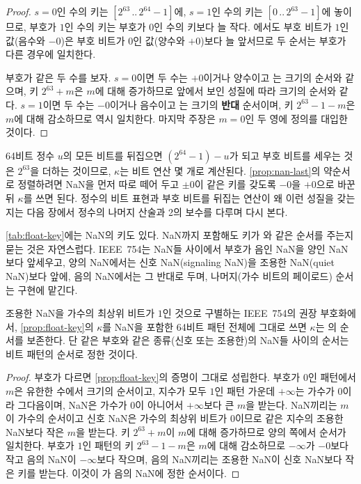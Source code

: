 \begin{proof}
$s=0$인 수의 키는 $[2^{63}\,..\,2^{64}-1]$에, $s=1$인 수의 키는 $[0\,..\,2^{63}-1]$에 놓이므로, 부호가 $1$인 수의 키는 부호가 $0$인 수의 키보다 늘 작다. 에서도 부호 비트가 $1$인 값(음수와 $-0$)은 부호 비트가 $0$인 값(양수와 $+0$)보다 늘 앞서므로 두 순서는 부호가 다른 경우에 일치한다.

부호가 같은 두 수를 보자. $s=0$이면 두 수는 $+0$이거나 양수이고 는 크기의 순서와 같으며, 키 $2^{63}+m$은 $m$에 대해 증가하므로 앞에서 보인 성질에 따라 크기의 순서와 같다. $s=1$이면 두 수는 $-0$이거나 음수이고 는 크기의 \textbf{반대} 순서이며, 키 $2^{63}-1-m$은 $m$에 대해 감소하므로 역시 일치한다. 마지막 주장은 $m=0$인 두 영에 정의를 대입한 것이다.
\end{proof}

64비트 정수 $u$의 모든 비트를 뒤집으면 $(2^{64}-1)-u$가 되고 부호 비트를 세우는 것은 $2^{63}$을 더하는 것이므로, $\kappa$는 비트 연산 몇 개로 계산된다. \cref{prop:nan-last}의 약순서로 정렬하려면 NaN을 먼저 따로 떼어 두고 $\pm0$이 같은 키를 갖도록 $-0$을 $+0$으로 바꾼 뒤 $\kappa$를 쓰면 된다. 정수의 비트 표현과 부호 비트를 뒤집는 연산이 왜 이런 성질을 갖는지는 다음 장에서 정수의 나머지 산술과 2의 보수를 다루며 다시 본다.

\cref{tab:float-key}에는 NaN의 키도 있다. NaN까지 포함해도 키가 와 같은 순서를 주는지 묻는 것은 자연스럽다. IEEE~754는 NaN들 사이에서 부호가 음인 NaN을 양인 NaN보다 앞세우고, 양의 NaN에서는 신호 NaN(signaling NaN)을 조용한 NaN(quiet NaN)보다 앞에, 음의 NaN에서는 그 반대로 두며, 나머지(가수 비트의 페이로드) 순서는 구현에 맡긴다\cite{ieee754-2019}.

\begin{proposition}
\label{prop:float-key-nan}
조용한 NaN을 가수의 최상위 비트가 $1$인 것으로 구별하는 IEEE~754의 권장 부호화에서, \cref{prop:float-key}의 $\kappa$를 NaN을 포함한 64비트 패턴 전체에 그대로 쓰면 $\kappa$는 의 순서를 보존한다. 단 같은 부호와 같은 종류(신호 또는 조용한)의 NaN들 사이의 순서는 비트 패턴의 순서로 정한 것이다.
\end{proposition}

\begin{proof}
부호가 다르면 \cref{prop:float-key}의 증명이 그대로 성립한다. 부호가 $0$인 패턴에서 $m$은 유한한 수에서 크기의 순서이고, 지수가 모두 $1$인 패턴 가운데 $+\infty$는 가수가 $0$이라 그다음이며, NaN은 가수가 $0$이 아니어서 $+\infty$보다 큰 $m$을 받는다. NaN끼리는 $m$이 가수의 순서이고 신호 NaN은 가수의 최상위 비트가 $0$이므로 같은 지수의 조용한 NaN보다 작은 $m$을 받는다. 키 $2^{63}+m$이 $m$에 대해 증가하므로 양의 쪽에서 순서가 일치한다. 부호가 $1$인 패턴의 키 $2^{63}-1-m$은 $m$에 대해 감소하므로 $-\infty$가 $-0$보다 작고 음의 NaN이 $-\infty$보다 작으며, 음의 NaN끼리는 조용한 NaN이 신호 NaN보다 작은 키를 받는다. 이것이 가 음의 NaN에 정한 순서이다.
\end{proof}

